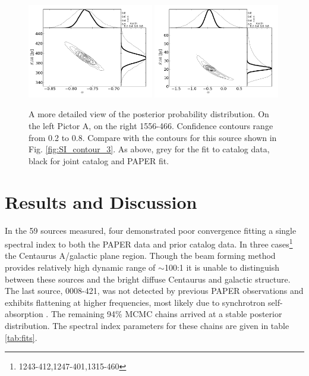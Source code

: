 \documentclass[preprint]{aastex}
\begin{document}
\begin{figure}[htbp]
\includegraphics[width=0.49\textwidth]{plots/pic_trace_hist.png}
\includegraphics[width=0.49\textwidth]{plots/1556-466_trace_hist.png}
\caption{
A more detailed view of the posterior probability distribution. On the left
Pictor A, on the right 1556-466. Confidence contours range from 0.2 to 0.8.
Compare with the contours for this source shown in Fig. \ref{fig:SI_contour_3}.
As above, grey for  the fit to catalog data, black for joint catalog and PAPER
fit.
}
\end{figure}




\section{Results and Discussion}
\label{sec:fits}


In the 59 sources measured, four demonstrated poor convergence fitting a single
spectral index to both the PAPER data and prior catalog data. In three
cases\footnote{1243-412,1247-401,1315-460} %
the Centaurus A/galactic plane region. Though the beam forming method provides
relatively high dynamic range of $\sim$100:1 it is unable to distinguish
between these sources and the bright diffuse Centaurus and galactic structure.
The last source, 0008-421, was not detected by previous PAPER observations and
exhibits flattening at higher frequencies, most likely due to synchrotron
self-absorption \citep{Jacobs:2011p8438} .  The remaining 94\% MCMC chains
arrived at a stable posterior distribution. The spectral index parameters for
these chains are given in table \ref{tab:fits}.
\end{document}
